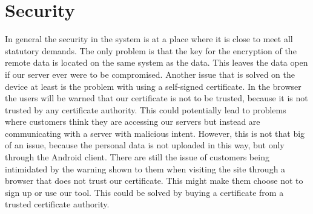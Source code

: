 
\section{Security}
\label{sec:security}

In general the security in the system is at a place where it is close to meet all statutory demands. The only problem is that the key for the encryption of the remote data is located on the same system as the data. This leaves the data open if our server ever were to be compromised. Another issue that is solved on the device at least is the problem with using a self-signed certificate. In the browser the users will be warned that our certificate is not to be trusted, because it is not trusted by any certificate authority. This could potentially lead to problems where customers think they are accessing our servers but instead are communicating with a server with malicious intent. However, this is not that big of an issue, because the personal data is not uploaded in this way, but only through the Android client. There are still the issue of customers being intimidated by the warning shown to them when visiting the site through a browser that does not trust our certificate. This might make them choose not to sign up or use our tool. This could be solved by buying a certificate from a trusted certificate authority. 
